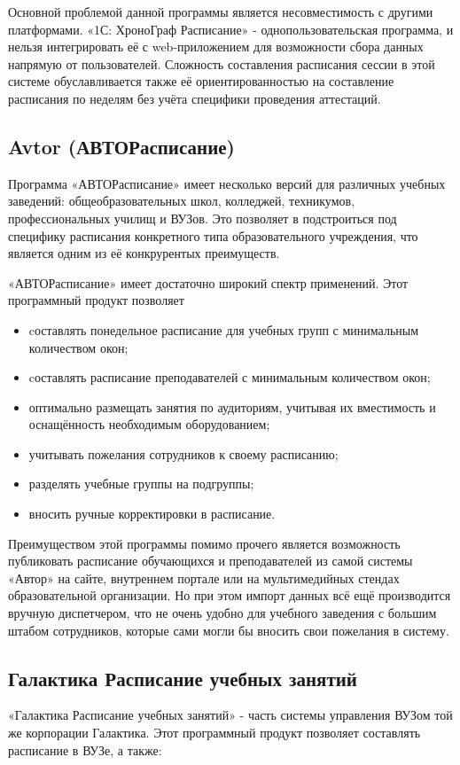 Основной проблемой данной программы является несовместимость с другими платформами. «1С: ХроноГраф Расписание» - однопользовательская программа, и нельзя интегрировать её с web-приложением для возможности сбора данных напрямую от пользователей. Сложность составления расписания сессии в этой системе обуславливается также её ориентированностью на составление расписания по неделям без учёта специфики проведения аттестаций.

\subsection{Avtor (АВТОРасписание)} 
 \cite{http://avtor.bravosoft.org/}
Программа «АВТОРасписание» имеет несколько версий для различных учебных заведений: общеобразовательных школ, колледжей, техникумов, профессиональных училищ и ВУЗов. Это позволяет в подстроиться под специфику расписания конкретного типа образовательного учреждения, что является одним из её конкрурентых преимуществ.

«АВТОРасписание» имеет достаточно широкий спектр применений. Этот программный продукт позволяет
\begin{itemize}
	\item cоставлять понедельное расписание для учебных групп с минимальным количеством окон;
	\item cоставлять расписание преподавателей с минимальным количеством окон;
	\item оптимально размещать занятия по аудиториям, учитывая их вместимость и оснащённость необходимым оборудованием;
	\item учитывать пожелания сотрудников к своему расписанию;
	\item разделять учебные группы на подгруппы;
	\item вносить ручные корректировки в расписание.
\end{itemize}

Преимуществом этой программы помимо прочего является возможность публиковать расписание обучающихся и преподавателей из самой системы «Автор» на сайте, внутреннем портале или на мультимедийных стендах образовательной организации. Но при этом импорт данных всё ещё производится вручную диспетчером, что не очень удобно для учебного заведения с большим штабом сотрудников, которые сами могли бы вносить свои пожелания в систему.

\subsection{Галактика Расписание учебных занятий}
 \cite{https://galaktika-it.ru}
«Галактика Расписание учебных занятий» - часть системы управления ВУЗом той же корпорации Галактика. Этот программный продукт позволяет составлять расписание в ВУЗе, а также:

